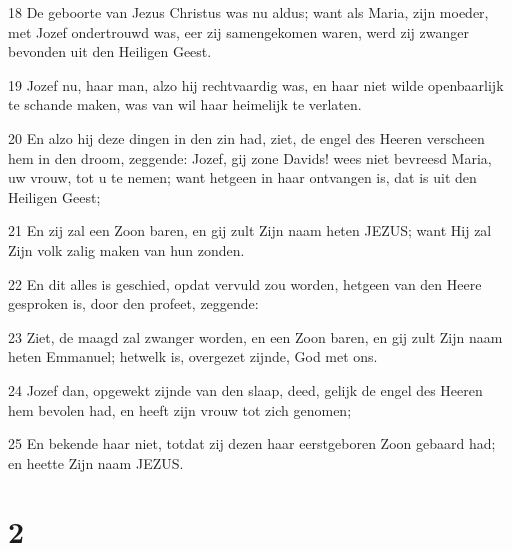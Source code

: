 \par 18 De geboorte van Jezus Christus was nu aldus; want als Maria, zijn moeder, met Jozef ondertrouwd was, eer zij samengekomen waren, werd zij zwanger bevonden uit den Heiligen Geest.
\par 19 Jozef nu, haar man, alzo hij rechtvaardig was, en haar niet wilde openbaarlijk te schande maken, was van wil haar heimelijk te verlaten.
\par 20 En alzo hij deze dingen in den zin had, ziet, de engel des Heeren verscheen hem in den droom, zeggende: Jozef, gij zone Davids! wees niet bevreesd Maria, uw vrouw, tot u te nemen; want hetgeen in haar ontvangen is, dat is uit den Heiligen Geest;
\par 21 En zij zal een Zoon baren, en gij zult Zijn naam heten JEZUS; want Hij zal Zijn volk zalig maken van hun zonden.
\par 22 En dit alles is geschied, opdat vervuld zou worden, hetgeen van den Heere gesproken is, door den profeet, zeggende:
\par 23 Ziet, de maagd zal zwanger worden, en een Zoon baren, en gij zult Zijn naam heten Emmanuel; hetwelk is, overgezet zijnde, God met ons.
\par 24 Jozef dan, opgewekt zijnde van den slaap, deed, gelijk de engel des Heeren hem bevolen had, en heeft zijn vrouw tot zich genomen;
\par 25 En bekende haar niet, totdat zij dezen haar eerstgeboren Zoon gebaard had; en heette Zijn naam JEZUS.

\chapter{2}

